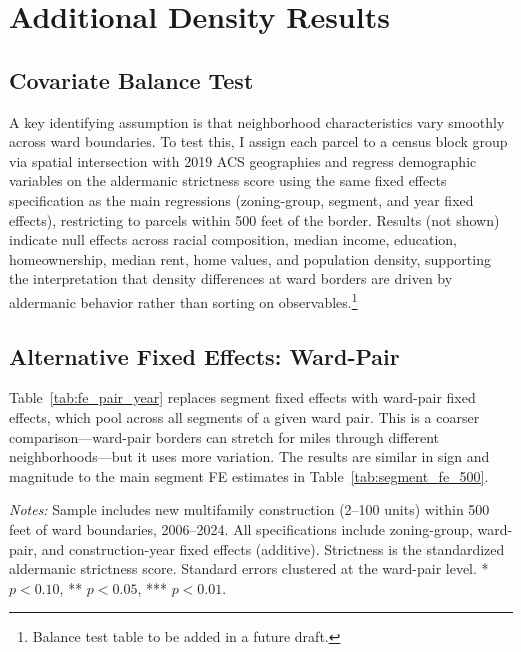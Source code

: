 \section{Additional Density Results}
\label{sec:appendix_density}

\subsection{Covariate Balance Test}

A key identifying assumption is that neighborhood characteristics vary smoothly across ward boundaries. To test this, I assign each parcel to a census block group via spatial intersection with 2019 ACS geographies and regress demographic variables on the aldermanic strictness score using the same fixed effects specification as the main regressions (zoning-group, segment, and year fixed effects), restricting to parcels within 500 feet of the border. Results (not shown) indicate null effects across racial composition, median income, education, homeownership, median rent, home values, and population density, supporting the interpretation that density differences at ward borders are driven by aldermanic behavior rather than sorting on observables.\footnote{Balance test table to be added in a future draft.}

\subsection{Alternative Fixed Effects: Ward-Pair}

Table~\ref{tab:fe_pair_year} replaces segment fixed effects with ward-pair fixed effects, which pool across all segments of a given ward pair. This is a coarser comparison---ward-pair borders can stretch for miles through different neighborhoods---but it uses more variation. The results are similar in sign and magnitude to the main segment FE estimates in Table~\ref{tab:segment_fe_500}.

\begin{table}[H]
    \caption{Effect of Aldermanic Strictness on Development Density (Ward-Pair FE)}
    \label{tab:fe_pair_year}

    

    \footnotesize
    \textit{Notes:} Sample includes new multifamily construction (2--100 units) within 500 feet of ward boundaries, 2006--2024. All specifications include zoning-group, ward-pair, and construction-year fixed effects (additive). Strictness is the standardized aldermanic strictness score. Standard errors clustered at the ward-pair level. * $p<0.10$, ** $p<0.05$, *** $p<0.01$.
\end{table}

